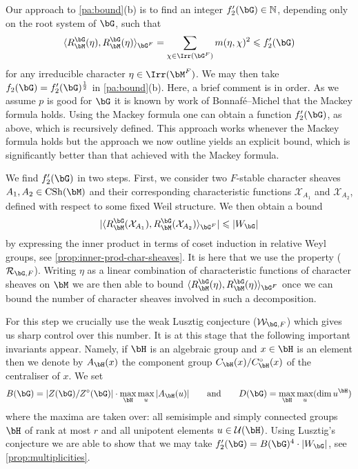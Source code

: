 \documentclass[eqthmnum,nocolour,skinny]{jt-calcs}
\DeclareMathOperator{\CS}{CSh}
\begin{document}
\begin{pa}
Our approach to \ref{pa:bound}(b) is to find an integer $f_2'(\bG) \in \mathbb{N}$, depending only on the root system of $\bG$, such that
\begin{equation*}
\langle R_{\bM}^{\bG}(\eta), R_{\bM}^{\bG}(\eta)\rangle_{\bG^F} = \sum_{\chi \in \Irr(\bG^F)} m(\eta,\chi)^2 \leqslant f_2'(\bG)
\end{equation*}
for any irreducible character $\eta \in \Irr(\bM^F)$. We may then take $f_2(\bG) = f_2'(\bG)^{\frac{1}{2}}$ in \ref{pa:bound}(b). Here, a brief comment is in order. As we assume $p$ is good for $\bG$ it is known by work of Bonnaf\'e--Michel \cite{bonnafe-michel:2011:mackey-formula} that the Mackey formula holds. Using the Mackey formula one can obtain a function $f_2'(\bG)$, as above, which is recursively defined. This approach works whenever the Mackey formula holds but the approach we now outline yields an explicit bound, which is significantly better than that achieved with the Mackey formula.
\end{pa}



\begin{pa}
We find $f_2'(\bG)$ in two steps. First, we consider two $F$-stable character sheaves $A_1,A_2 \in \CS(\bM)$ and their corresponding characteristic functions $\mathcal{X}_{A_1}$ and $\mathcal{X}_{A_2}$, defined with respect to some fixed Weil structure. We then obtain a bound
\begin{equation*}
|\langle R_{\bM}^{\bG}(\mathcal{X}_{A_1}), R_{\bM}^{\bG}(\mathcal{X}_{A_2})\rangle_{\bG^F}| \leqslant |W_{\bG}|
\end{equation*}
by expressing the inner product in terms of coset induction in relative Weyl groups, see \cref{prop:inner-prod-char-sheaves}. It is here that we use the property ($\mathcal{R}_{\bG,F}$). Writing $\eta$ as a linear combination of characteristic functions of character sheaves on $\bM$ we are then able to bound $\langle R_{\bM}^{\bG}(\eta), R_{\bM}^{\bG}(\eta)\rangle_{\bG^F}$ once we can bound the number of character sheaves involved in such a decomposition.
\end{pa}

\begin{pa}\label{pa:bound-inner}
For this step we crucially use the weak Lusztig conjecture ($\mathcal{W}_{\bG,F}$) which gives us sharp control over this number. It is at this stage that the following important invariants appear. Namely, if $\bH$ is an algebraic group and $x \in \bH$ is an element then we denote by $A_{\bH}(x)$ the component group $C_{\bH}(x)/C_{\bH}^{\circ}(x)$ of the centraliser of $x$. We set
\begin{equation*}
B(\bG) = |Z(\bG)/Z^{\circ}(\bG)|\cdot \max_{\bH}\max_u |A_{\bH}(u)| \qquad\text{and}\qquad D(\bG) = \max_{\bH}\max_u (\dim u^{\bH})
\end{equation*}
where the maxima are taken over: all semisimple and simply connected groups $\bH$ of rank at most $r$ and all unipotent elements $u \in \mathcal{U}(\bH)$. Using Lusztig's conjecture we are able to show that we may take $f_2'(\bG) = B(\bG)^4 \cdot |W_{\bG}|$, see \cref{prop:multiplicities}.
\end{pa}
\end{document}
